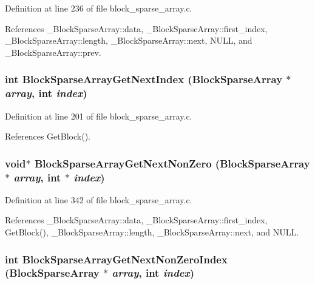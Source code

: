 Definition at line 236 of file block\_\-sparse\_\-array.c.

References \_\-Block\-Sparse\-Array::data, \_\-Block\-Sparse\-Array::first\_\-index, \_\-Block\-Sparse\-Array::length, \_\-Block\-Sparse\-Array::next, NULL, and \_\-Block\-Sparse\-Array::prev.
\subsubsection{\setlength{\rightskip}{0pt plus 5cm}int Block\-Sparse\-Array\-Get\-Next\-Index (\bf{Block\-Sparse\-Array} $\ast$ {\em array}, int {\em index})}\label{block__sparse__array_8c_e8d38d30d99d06ccbc76c978f2325646}




Definition at line 201 of file block\_\-sparse\_\-array.c.

References Get\-Block().
\subsubsection{\setlength{\rightskip}{0pt plus 5cm}void$\ast$ Block\-Sparse\-Array\-Get\-Next\-Non\-Zero (\bf{Block\-Sparse\-Array} $\ast$ {\em array}, int $\ast$ {\em index})}\label{block__sparse__array_8c_2224a6eace237cc92f0c74744ab68247}




Definition at line 342 of file block\_\-sparse\_\-array.c.

References \_\-Block\-Sparse\-Array::data, \_\-Block\-Sparse\-Array::first\_\-index, Get\-Block(), \_\-Block\-Sparse\-Array::length, \_\-Block\-Sparse\-Array::next, and NULL.
\subsubsection{\setlength{\rightskip}{0pt plus 5cm}int Block\-Sparse\-Array\-Get\-Next\-Non\-Zero\-Index (\bf{Block\-Sparse\-Array} $\ast$ {\em array}, int {\em index})}\label{block__sparse__array_8c_2bc3cfe3a80e7f68cada4de4f38ab232}





